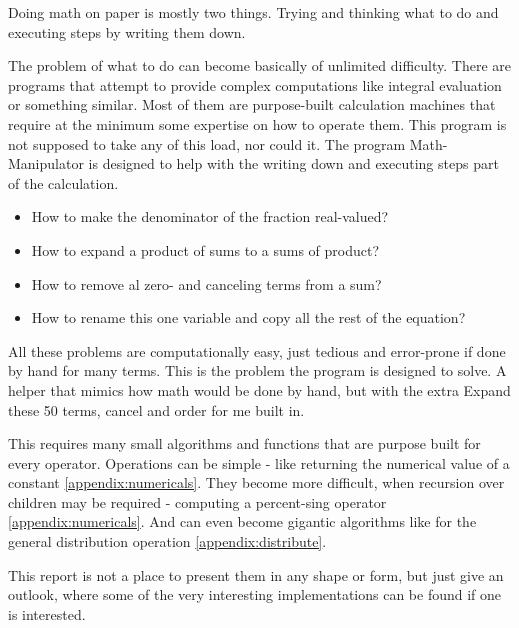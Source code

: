 Doing math on paper is mostly two things. 
Trying and thinking what to do and executing steps by writing them down.

The problem of \glqq what to do\grqq{} can become basically of unlimited difficulty. 
There are programs that attempt to provide complex computations like integral evaluation or something similar. 
Most of them are purpose-built calculation machines that require at the minimum some expertise on how to operate them.
This program is not supposed to take any of this load, nor could it.
The program Math-Manipulator is designed to help with the \glqq writing down\grqq{} and \glqq executing steps\grqq{} part of the calculation.

\begin{itemize}
    \item 
    How to make the denominator of the fraction real-valued?
    \item
    How to expand a product of sums to a sums of product?
    \item
    How to remove al zero- and canceling terms from a sum?
    \item
    How to rename this one variable and copy all the rest of the equation?
\end{itemize}

All these problems are computationally easy, just tedious and error-prone if done by hand for many terms. 
This is the problem the program is designed to solve. 
A helper that mimics how math would be done by hand, but with the extra \glqq Expand these 50 terms, cancel and order for me\grqq{} built in.

This requires many small algorithms and functions that are purpose built for every operator.
Operations can be simple - like returning the numerical value of a constant \ref{appendix:numericals}.
They become more difficult, when recursion over children may be required - computing a percent-sing operator \ref{appendix:numericals}.
And can even become gigantic algorithms like for the general distribution operation \ref{appendix:distribute}.

This report is not a place to present them in any shape or form, but just give an outlook, where some of the very interesting implementations can be found if one is interested. 